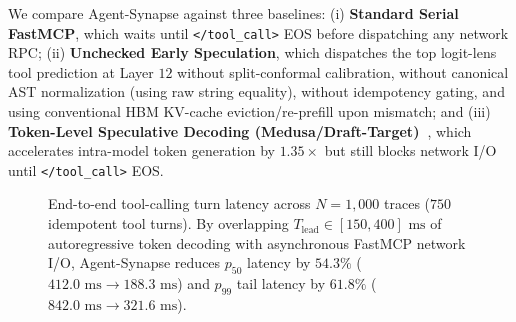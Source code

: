 \documentclass[10pt,conference]{IEEEtran}
\begin{document}
We compare Agent-Synapse against three baselines: (i) \textbf{Standard Serial FastMCP}, which waits until \texttt{</tool\_call>} EOS before dispatching any network RPC; (ii) \textbf{Unchecked Early Speculation}, which dispatches the top logit-lens tool prediction at Layer $12$ without split-conformal calibration, without canonical AST normalization (using raw string equality), without idempotency gating, and using conventional HBM KV-cache eviction/re-prefill upon mismatch; and (iii) \textbf{Token-Level Speculative Decoding (Medusa/Draft-Target)~\cite{leviathan2023fast, cai2024medusa}}, which accelerates intra-model token generation by $1.35\times$ but still blocks network I/O until \texttt{</tool\_call>} EOS.

\begin{figure}[t]
\centering
{}
\caption{End-to-end tool-calling turn latency across $N = 1{,}000$ traces ($750$ idempotent tool turns). By overlapping $T_{\text{lead}} \in [150, 400]\text{ ms}$ of autoregressive token decoding with asynchronous FastMCP network I/O, Agent-Synapse reduces $p_{50}$ latency by $54.3\%$ ($412.0\text{ ms} \to 188.3\text{ ms}$) and $p_{99}$ tail latency by $61.8\%$ ($842.0\text{ ms} \to 321.6\text{ ms}$).}
\label{fig:latency_overlap}
\end{figure}
\end{document}
